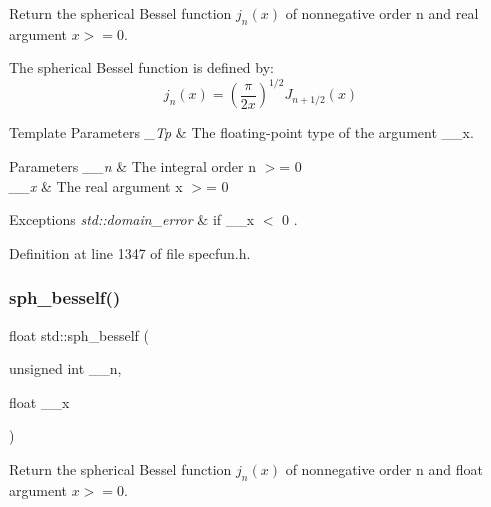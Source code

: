 Return the spherical Bessel function $ j_n(x) $ of nonnegative order n and real argument $ x >= 0 $.

The spherical Bessel function is defined by\+: \[ j_n(x) = \left(\frac{\pi}{2x} \right) ^{1/2} J_{n+1/2}(x) \]


\begin{DoxyTemplParams}{Template Parameters}
{\em \+\_\+\+Tp} & The floating-\/point type of the argument {\ttfamily \+\_\+\+\_\+x}. \\
\hline
\end{DoxyTemplParams}

\begin{DoxyParams}{Parameters}
{\em \+\_\+\+\_\+n} & The integral order {\ttfamily  n $>$= 0 } \\
\hline
{\em \+\_\+\+\_\+x} & The real argument {\ttfamily  x $>$= 0 } \\
\hline
\end{DoxyParams}

\begin{DoxyExceptions}{Exceptions}
{\em std\+::domain\+\_\+error} & if {\ttfamily  \+\_\+\+\_\+x $<$ 0 }. \\
\hline
\end{DoxyExceptions}


Definition at line 1347 of file specfun.\+h.

\mbox{\label{group__mathsf__std_ga534e36e1dcefad8daec98920db16eec4}} 
\subsubsection{\texorpdfstring{sph\+\_\+besself()}{sph\_besself()}}
{\footnotesize\ttfamily float std\+::sph\+\_\+besself (\begin{DoxyParamCaption}\item[{unsigned int}]{\+\_\+\+\_\+n,  }\item[{float}]{\+\_\+\+\_\+x }\end{DoxyParamCaption})\hspace{0.3cm}{\ttfamily [inline]}}

Return the spherical Bessel function $ j_n(x) $ of nonnegative order n and {\ttfamily float} argument $ x >= 0 $.

